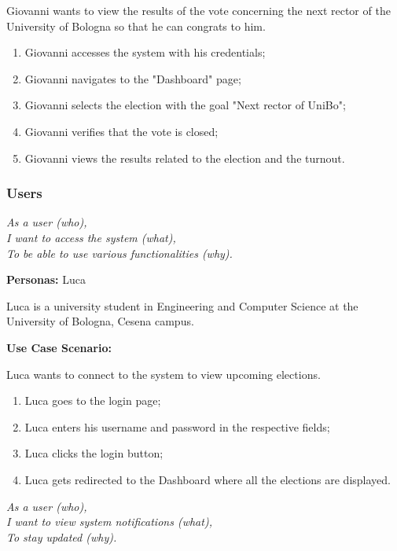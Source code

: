 \documentclass{scrartcl}
\begin{document}
Giovanni wants to view the results of the vote concerning the next rector of the University of Bologna so that he can congrats to him.

\begin{enumerate}
    \item Giovanni accesses the system with his credentials;
    \item Giovanni navigates to the "Dashboard" page;
    \item Giovanni selects the election with the goal "Next rector of UniBo";
    \item Giovanni verifies that the vote is closed;
    \item Giovanni views the results related to the election and the turnout.
\end{enumerate}

\subsubsection*{Users}

\noindent
\emph{%
    As a user (who), \\
    I want to access the system (what), \\
    To be able to use various functionalities (why).
}
\vspace*{0.2cm}

\textbf{Personas:} Luca

Luca is a university student in Engineering and Computer Science at the University of Bologna, Cesena campus.

\textbf{Use Case Scenario:}

Luca wants to connect to the system to view upcoming elections.

\begin{enumerate}
    \item Luca goes to the login page;
    \item Luca enters his username and password in the respective fields;
    \item Luca clicks the login button;
    \item Luca gets redirected to the Dashboard where all the elections are displayed.
\end{enumerate}

\vspace*{0.5cm}
\noindent
\emph{%
    As a user (who), \\
    I want to view system notifications (what), \\
    To stay updated (why).
}
\vspace*{0.2cm}
\end{document}

